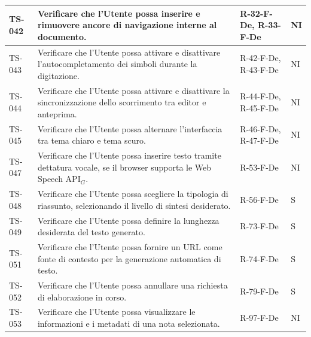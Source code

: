 \documentclass[a4paper, 10pt, colorlinks=true, linkcolor=black, urlcolor=blue, citecolor=blue, hidelinks]{article}
\begin{document}
\begin{longtable}{|p{1.4cm}|p{7.8cm}|p{2.3cm}|p{1.2cm}|}
    TS-042 & Verificare che l'Utente possa inserire e rimuovere ancore di navigazione interne al documento. & R-32-F-De, R-33-F-De & NI \\
    \hline
    TS-043 & Verificare che l'Utente possa attivare e disattivare l'autocompletamento dei simboli durante la digitazione. & R-42-F-De, R-43-F-De & NI \\
    \hline
    TS-044 & Verificare che l'Utente possa attivare e disattivare la sincronizzazione dello scorrimento tra editor e anteprima. & R-44-F-De, R-45-F-De & NI \\
    \hline
    TS-045 & Verificare che l'Utente possa alternare l'interfaccia tra tema chiaro e tema scuro. & R-46-F-De, R-47-F-De & NI \\
    \hline
    TS-047 & Verificare che l'Utente possa inserire testo tramite dettatura vocale, se il browser supporta le Web Speech API$_G$. & R-53-F-De & NI \\
    \hline
    TS-048 & Verificare che l'Utente possa scegliere la tipologia di riassunto, selezionando il livello di sintesi desiderato. & R-56-F-De & S \\
    \hline
    TS-049 & Verificare che l'Utente possa definire la lunghezza desiderata del testo generato. & R-73-F-De & S \\
    \hline
    TS-051 & Verificare che l'Utente possa fornire un URL come fonte di contesto per la generazione automatica di testo. & R-74-F-De & S \\
    \hline
    TS-052 & Verificare che l'Utente possa annullare una richiesta di elaborazione in corso. & R-79-F-De & S \\
    \hline
    TS-053 & Verificare che l'Utente possa visualizzare le informazioni e i metadati di una nota selezionata. & R-97-F-De & NI \\
    \hline


\end{longtable}
\end{document}
